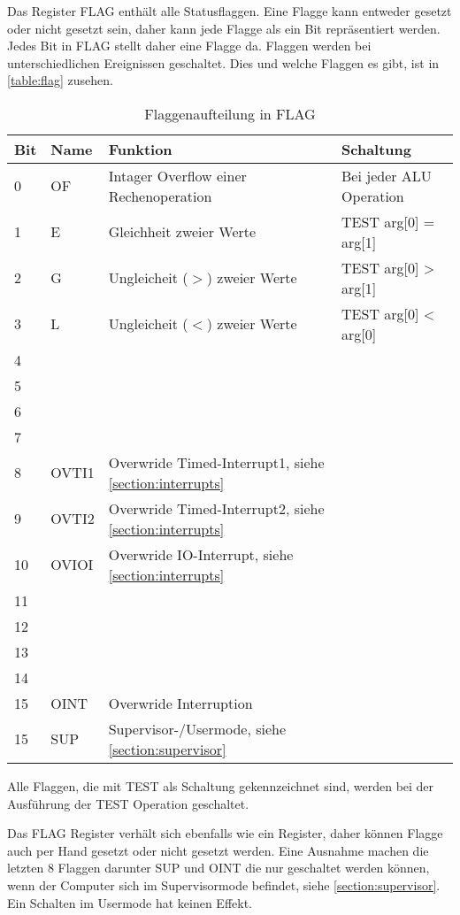 \documentclass{scrartcl}
\begin{document}
Das Register FLAG enthält alle Statusflaggen. Eine Flagge kann entweder gesetzt oder nicht gesetzt sein, daher kann jede Flagge als ein Bit repräsentiert werden. Jedes Bit in FLAG stellt daher eine Flagge da. Flaggen werden bei unterschiedlichen Ereignissen geschaltet. Dies und welche Flaggen es gibt, ist in \autoref{table:flag} zusehen.

\begin{center}
	\begin{table}[h]
		\caption{\label{table:flag}Flaggenaufteilung in FLAG}
		\begin{tabular}{l | l | l | l}
			Bit & Name & Funktion & Schaltung \\
			\hline
			 0 & OF  & Intager Overflow einer Rechenoperation & Bei jeder ALU Operation\\
			 1 & E   & Gleichheit zweier Werte & TEST arg[0] = arg[1]\\
			 2 & G   & Ungleicheit ($>$) zweier Werte & TEST arg[0] > arg[1]\\
			 3 & L   & Ungleicheit ($<$) zweier Werte & TEST arg[0] < arg[0]\\
			 4 &  &  &  \\
			 5 &  &  &  \\
			 6 &  &  &  \\
			 7 &  &  &  \\
			 8 & OVTI1 & Overwride Timed-Interrupt1, siehe \autoref{section:interrupts} &  \\
			 9 & OVTI2 & Overwride Timed-Interrupt2, siehe \autoref{section:interrupts} &  \\
			10 & OVIOI & Overwride IO-Interrupt, siehe \autoref{section:interrupts} &  \\
			11 &  &  &  \\
			12 &  &  &  \\
			13 &  &  &  \\
			14 &  &  &  \\
			15 & OINT & Overwride Interruption &  \\
			15 & SUP & Supervisor-/Usermode, siehe \autoref{section:supervisor} & 
		\end{tabular}
	\end{table}
\end{center}


Alle Flaggen, die mit TEST als Schaltung gekennzeichnet sind, werden bei der Ausführung der TEST Operation geschaltet.

Das FLAG Register verhält sich ebenfalls wie ein Register, daher können Flagge auch per Hand gesetzt oder nicht gesetzt werden. Eine Ausnahme machen die letzten 8 Flaggen darunter SUP und OINT die nur geschaltet werden können, wenn der Computer sich im Supervisormode befindet, siehe \autoref{section:supervisor}. Ein Schalten im Usermode hat keinen Effekt.
\end{document}
